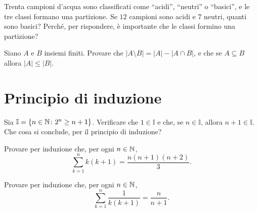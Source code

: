 \begin{esercizio}[\liv{2}]
Trenta campioni d'acqua sono classificati come ``acidi'', ``neutri'' o ``basici'', e le tre classi formano una partizione. Se $12$ campioni sono acidi e $7$ neutri, quanti sono basici? Perché, per rispondere, è importante che le classi formino una partizione?
\end{esercizio}

\begin{esercizio}[\liv{3}]
Siano $A$ e $B$ insiemi finiti. Provare che $|A\setminus B|=|A|-|A\cap B|$, e che se $A\subseteq B$ allora $|A|\le|B|$.
\end{esercizio}

\section{Principio di induzione}

\begin{esercizio}[\liv{1}]
Sia $\mathbb I=\{n\in\mathbb N\colon 2^{n}\ge n+1\}$. Verificare che $1\in\mathbb I$ e che, se $n\in\mathbb I$, allora $n+1\in\mathbb I$. Che cosa si conclude, per il principio di induzione?
\end{esercizio}

\begin{esercizio}[\liv{1}]
Provare per induzione che, per ogni $n\in\mathbb N$,
\[
\sum_{k=1}^{n}k(k+1)=\frac{n(n+1)(n+2)}{3}.
\]
\end{esercizio}

\begin{esercizio}[\liv{1}]
Provare per induzione che, per ogni $n\in\mathbb N$,
\[
\sum_{k=1}^{n}\frac{1}{k(k+1)}=\frac{n}{n+1}.
\]
\end{esercizio}

